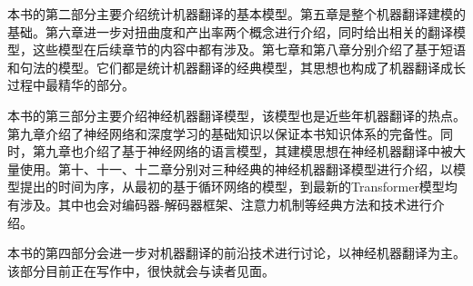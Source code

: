 \begin{spacing}{1.18}
本书的第二部分主要介绍统计机器翻译的基本模型。第五章是整个机器翻译建模的基础。第六章进一步对扭曲度和产出率两个概念进行介绍，同时给出相关的翻译模型，这些模型在后续章节的内容中都有涉及。第七章和第八章分别介绍了基于短语和句法的模型。它们都是统计机器翻译的经典模型，其思想也构成了机器翻译成长过程中最精华的部分。

本书的第三部分主要介绍神经机器翻译模型，该模型也是近些年机器翻译的热点。第九章介绍了神经网络和深度学习的基础知识以保证本书知识体系的完备性。同时，第九章也介绍了基于神经网络的语言模型，其建模思想在神经机器翻译中被大量使用。第十、十一、十二章分别对三种经典的神经机器翻译模型进行介绍，以模型提出的时间为序，从最初的基于循环网络的模型，到最新的Transformer模型均有涉及。其中也会对编码器-解码器框架、注意力机制等经典方法和技术进行介绍。

本书的第四部分会进一步对机器翻译的前沿技术进行讨论，以神经机器翻译为主。该部分目前正在写作中，很快就会与读者见面。

\begin{figure}[htp]
\centering
\centering

\end{figure}

\end{spacing}








